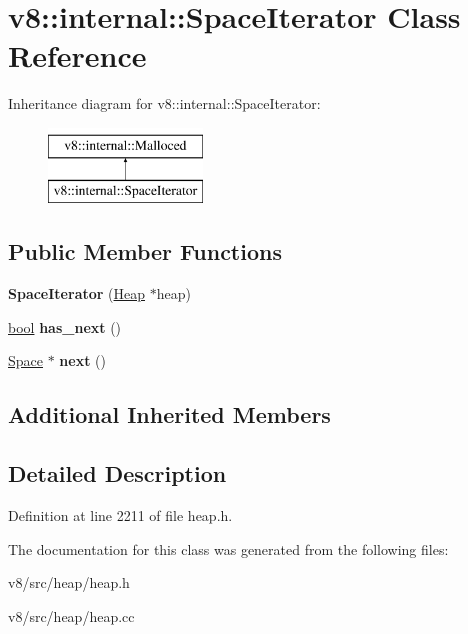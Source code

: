 \hypertarget{classv8_1_1internal_1_1SpaceIterator}{}\section{v8\+:\+:internal\+:\+:Space\+Iterator Class Reference}
\label{classv8_1_1internal_1_1SpaceIterator}
Inheritance diagram for v8\+:\+:internal\+:\+:Space\+Iterator\+:\begin{figure}[H]
\begin{center}
\leavevmode
\includegraphics[height=2.000000cm]{classv8_1_1internal_1_1SpaceIterator}
\end{center}
\end{figure}
\subsection*{Public Member Functions}
\begin{DoxyCompactItemize}
\item 
\mbox{\label{classv8_1_1internal_1_1SpaceIterator_af9a3044ca1651af702fdaf8f10c816d5}} 
{\bfseries Space\+Iterator} (\mbox{\hyperlink{classv8_1_1internal_1_1Heap}{Heap}} $\ast$heap)
\item 
\mbox{\label{classv8_1_1internal_1_1SpaceIterator_ad580ae3fee14e8352e6de8ab9b7425da}} 
\mbox{\hyperlink{classbool}{bool}} {\bfseries has\+\_\+next} ()
\item 
\mbox{\label{classv8_1_1internal_1_1SpaceIterator_a95461cab5c8bd43d4ba9abcb4b87d6c9}} 
\mbox{\hyperlink{classv8_1_1internal_1_1Space}{Space}} $\ast$ {\bfseries next} ()
\end{DoxyCompactItemize}
\subsection*{Additional Inherited Members}


\subsection{Detailed Description}


Definition at line 2211 of file heap.\+h.



The documentation for this class was generated from the following files\+:\begin{DoxyCompactItemize}
\item 
v8/src/heap/heap.\+h\item 
v8/src/heap/heap.\+cc\end{DoxyCompactItemize}
